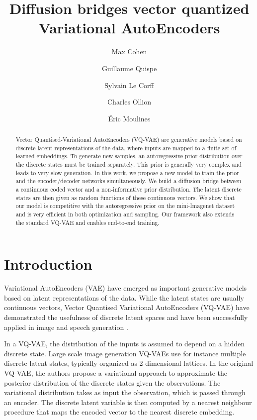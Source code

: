 \documentclass{article}
\title{Diffusion bridges  vector quantized Variational AutoEncoders}
\date{}
\author[$\star$]{Max Cohen}
\author[$\dag$]{Guillaume Quispe}
\author[$\star$]{Sylvain Le Corff}
\author[$\dag$]{Charles Ollion}
\author[$\dag$]{\'Eric Moulines}
\affil[$\star$]{{\small SAMOVAR, T\'el\'ecom SudParis, Institut Polytechnique de Paris, Palaiseau.}}
\affil[$\dag$]{{\small CMAP, \'Ecole Polytechnique, Institut Polytechnique de Paris, Palaiseau.}}
\theoremstyle{plain}
\theoremstyle{definition}
\theoremstyle{remark}
\begin{document}
\maketitle

\begin{abstract}
Vector Quantised-Variational AutoEncoders (VQ-VAE) are generative models based on discrete latent representations of the data, where inputs are mapped to a finite set of learned embeddings.
To generate new samples, an autoregressive prior distribution over the discrete states must be trained separately. This prior is generally very complex and leads to very slow generation. In this work, we propose a new model to train the prior and the encoder/decoder networks simultaneously. We build a diffusion bridge between a continuous coded vector and a non-informative prior distribution.  The latent discrete states are then given as random functions of these continuous vectors. We show that our model is competitive with the autoregressive prior on the mini-Imagenet dataset and is very efficient in both optimization and sampling. Our framework also extends the standard VQ-VAE and enables end-to-end training.
\end{abstract}


\section{Introduction}
Variational AutoEncoders (VAE) have emerged as important generative models based on latent representations of the data. 
While the latent states are usually continuous vectors, Vector Quantised Variational AutoEncoders (VQ-VAE) have demonstrated the usefulness of discrete latent spaces and have been successfully applied in image and speech generation \cite{oord2017neural, esser2021taming, ramesh2021zero}. 

In a VQ-VAE, the distribution of the inputs is assumed to depend on a hidden discrete state. Large scale image generation VQ-VAEs use for instance multiple discrete latent states, typically organized as 2-dimensional lattices. In the original VQ-VAE, the authors propose a variational approach to approximate the posterior distribution of the discrete states given the observations. The variational distribution takes as input the observation, which is passed through an encoder. The discrete latent variable is then computed by a nearest neighbour procedure that maps the encoded vector to the nearest discrete embedding. 
\end{document}
